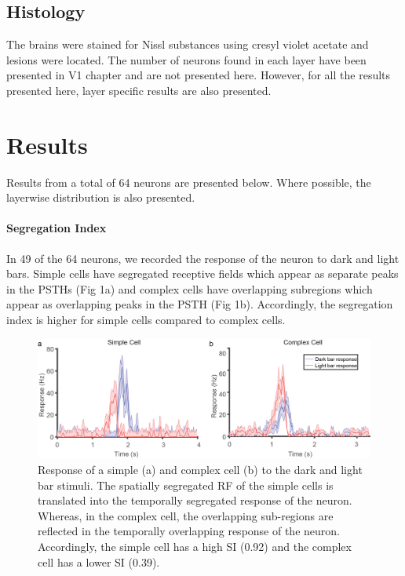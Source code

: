 		\subsection{Histology}
				The brains were stained for Nissl substances using cresyl violet acetate and lesions were located. The number of neurons found in each layer have been presented in V1 chapter and are not presented here. However, for all the results presented here, layer specific results are also presented.
							
					

	\section{Results}
	
		Results from a total of 64 neurons are presented below. Where possible, the layerwise distribution is also presented. 
		
	\paragraph {Segregation Index}	
	In 49 of the 64 neurons, we recorded the response of the neuron to dark and light bars. Simple cells have segregated receptive fields which appear as separate peaks in the PSTHs (Fig 1a) and complex cells have overlapping subregions which appear as overlapping peaks in the PSTH (Fig 1b). Accordingly, the segregation index is higher for simple cells compared to complex cells.
	
		\begin{figure}[H]
		
		\includegraphics[width=\linewidth]{LinearV1/simplecomplex.jpg}
		\caption{Response of a simple (a) and complex cell (b) to the dark and light bar stimuli. The spatially segregated RF of the simple cells is translated into the temporally segregated response of the neuron. Whereas, in the complex cell, the overlapping sub-regions are reflected in the temporally overlapping response of the neuron. Accordingly, the simple cell has a high SI (0.92) and the complex cell has a lower SI (0.39).}
		\label{fig:fig1}
	\end{figure}
	

